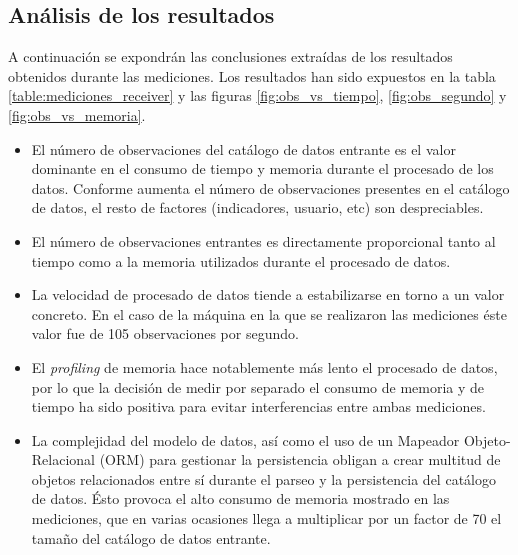 \subsection{Análisis de los resultados}
	A continuación se expondrán las conclusiones extraídas de los resultados obtenidos durante las mediciones. Los resultados han sido expuestos en la tabla \ref{table:mediciones_receiver} y las figuras \ref{fig:obs_vs_tiempo}, \ref{fig:obs_segundo} y \ref{fig:obs_vs_memoria}.
	\begin{itemize}
		\item
			El número de observaciones del catálogo de datos entrante es el valor dominante en el consumo de tiempo y memoria durante el procesado de los datos.  Conforme aumenta el número de observaciones presentes en el catálogo de datos, el resto de factores (indicadores, usuario, etc) son despreciables.
		\item
			El número de observaciones entrantes es directamente proporcional tanto al tiempo como a la memoria utilizados durante el procesado de datos. 
		\item
			La velocidad de procesado de datos tiende a estabilizarse en torno a un valor concreto.  En el caso de la máquina en la que se realizaron las mediciones éste valor fue de 105 observaciones por segundo.
		\item
			El \textit{profiling} de memoria hace notablemente más lento el procesado de datos, por lo que la decisión de medir por separado el consumo de memoria y de tiempo ha sido positiva para evitar interferencias entre ambas mediciones.
		\item
			La complejidad del modelo de datos, así como el uso de un Mapeador Objeto-Relacional (ORM) para gestionar la persistencia obligan a crear multitud de objetos relacionados entre sí durante el parseo y la persistencia del catálogo de datos.  Ésto provoca el alto consumo de memoria mostrado en las mediciones, que en varias ocasiones llega a multiplicar por un factor de 70 el tamaño del catálogo de datos entrante.
	\end{itemize}

